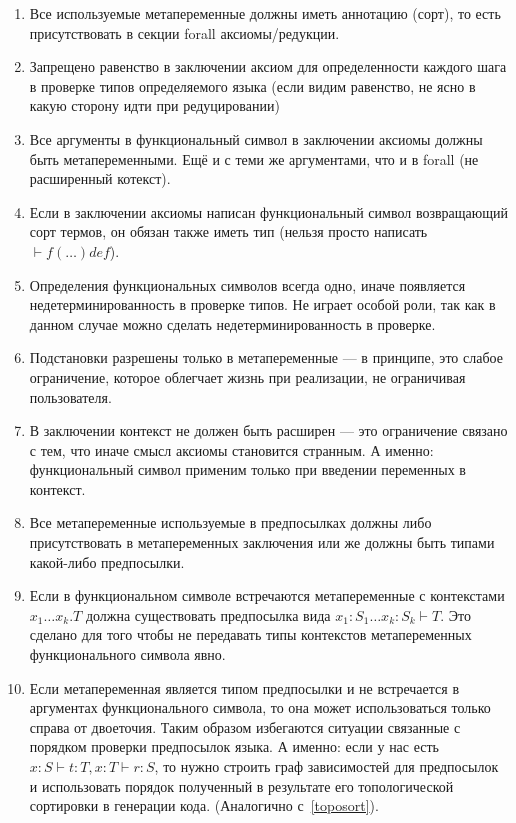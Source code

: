 \begin{enumerate}

\item Все используемые метапеременные должны иметь аннотацию (сорт), то есть присутствовать в секции forall аксиомы/редукции.

\item Запрещено равенство в заключении аксиом для определенности каждого шага в проверке типов определяемого языка (если видим равенство, не ясно в какую сторону идти при редуцировании)

\item Все аргументы в функциональный символ в заключении аксиомы должны быть метапеременными. Ещё и с теми же аргументами, что и в forall (не расширенный котекст).

\item Если в заключении аксиомы написан функциональный символ возвращающий сорт термов, он обязан также иметь тип (нельзя просто написать $ \vdash f(\ldots) def$).

\item Определения функциональных символов всегда одно, иначе появляется недетерминированность в проверке типов. Не играет особой роли, так как в данном случае можно сделать недетерминированность в проверке.

\item Подстановки разрешены только в метапеременные --- в принципе, это слабое ограничение, которое облегчает жизнь при реализации, не ограничивая пользователя.

\item В заключении контекст не должен быть расширен --- это ограничение связано с тем, что иначе смысл аксиомы становится странным. А именно: функциональный символ применим только при введении переменных в контекст.

\item \label{tm:Meta} Все метапеременные используемые в предпосылках должны либо присутствовать в метапеременных заключения или же должны быть типами какой-либо предпосылки.

\item Если в функциональном символе встречаются метапеременные с контекстами $x_1 \ldots x_k . T$ должна существовать предпосылка вида $x_1 : S_1 \ldots x_k : S_k  \vdash T$. Это сделано для того чтобы не передавать типы контекстов метапеременных функционального символа явно.

\item Если метапеременная является типом предпосылки и не встречается в аргументах функционального символа, то она может использоваться только справа от двоеточия. Таким образом избегаются ситуации связанные с порядком проверки предпосылок языка. А именно: если у нас есть $x : S \vdash t : T, x:T \vdash r : S$, то нужно строить граф зависимостей для предпосылок и использовать порядок полученный в результате его топологической сортировки в генерации кода. (Аналогично с~\ref{toposort}).


\end{enumerate}
